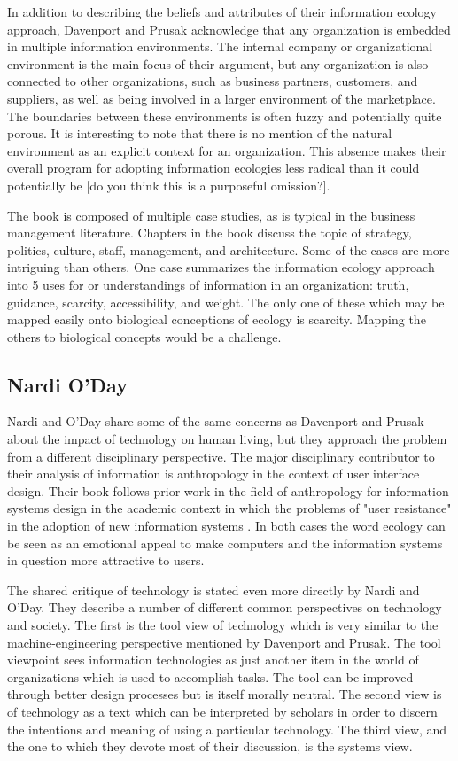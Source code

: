 In addition to describing the beliefs and attributes of their information ecology approach, Davenport and Prusak acknowledge that any organization is embedded in multiple information environments. The internal company or organizational environment is the main focus of their argument, but any organization is also connected to other organizations, such as business partners, customers, and suppliers, as well as being involved in a larger environment of the marketplace. The boundaries between these environments is often fuzzy and potentially quite porous. It is interesting to note that there is no mention of the natural environment as an explicit context for an organization. This absence makes their overall program for adopting information ecologies less radical than it could potentially be [do you think this is a purposeful omission?].

The book is composed of multiple case studies, as is typical in the business management literature. Chapters in the book discuss the topic of strategy, politics, culture, staff, management, and architecture. Some of the cases are more intriguing than others. One case summarizes the information ecology approach into 5 uses for or understandings of information in an organization: truth, guidance, scarcity, accessibility, and weight. The only one of these which may be mapped easily onto biological conceptions of ecology is scarcity. Mapping the others to biological concepts would be a challenge.

\subsection{Nardi O'Day}

Nardi and O'Day share some of the same concerns as Davenport and Prusak about the impact of technology on human living, but they approach the problem from a different disciplinary perspective. The major disciplinary contributor to their analysis of information is anthropology in the context of user interface design. Their book follows prior work in the field of anthropology for information systems design in the academic context in which the problems of "user resistance" in the adoption of new information systems \citep{star_1996}. In both cases the word ecology can be seen as an emotional appeal to make computers and the information systems in question more attractive to users.

The shared critique of technology is stated even more directly by Nardi and O'Day. They describe a number of different common perspectives on technology and society. The first is the tool view of technology which is very similar to the machine-engineering perspective mentioned by Davenport and Prusak. The tool viewpoint sees information technologies as just another item in the world of organizations which is used to accomplish tasks. The tool can be improved through better design processes but is itself morally neutral. The second view is of technology as a text which can be interpreted by scholars in order to discern the intentions and meaning of using a particular technology. The third view, and the one to which they devote most of their discussion, is the systems view.

